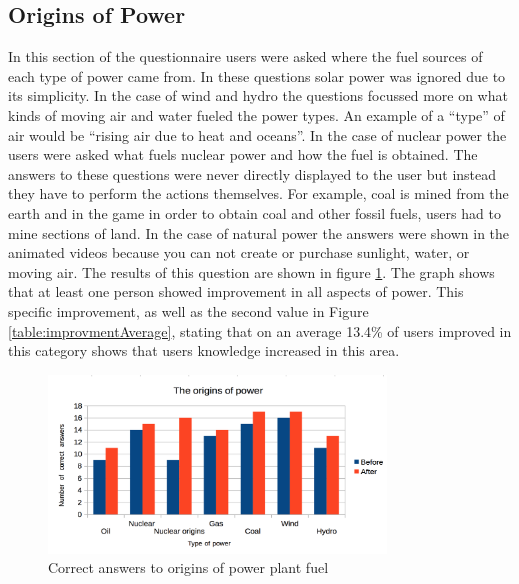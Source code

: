 \documentclass[msc,oneside]{ubcthesis}%
\begin{document}
\subsection{Origins of Power}
  In this section of the questionnaire users were asked where the fuel sources of each type of power came from. In these questions solar power was ignored due to its simplicity. In the case of wind and hydro the questions focussed more on what kinds of moving air and water fueled the power types. An example of a ``type'' of air would be ``rising air due to heat and oceans''. In the case of nuclear power the users were asked what fuels nuclear power and how the fuel is obtained. The answers to these questions were never directly displayed to the user but instead they have to perform the actions themselves. For example, coal is mined from the earth and in the game in order to obtain coal and other fossil fuels, users had to mine sections of land. In the case of natural power the answers were shown in the animated videos because you can not create or purchase sunlight, water, or moving air. The results of this question are shown in figure \ref{origins}. The graph shows that at least one person showed improvement in all aspects of power. This specific improvement, as well as the second value in Figure \ref{table:improvmentAverage}, stating that on an average 13.4\% of users improved in this category shows that users knowledge increased in this area.

  \begin{figure}[hbt]
  \begin{center}
    \includegraphics[width=0.8\textwidth]{survey_pics/post_and_pre/origins}
    \caption[Origins of power fuel]{Correct answers to origins of power plant fuel}\label{origins}
  \end{center}
\end{figure}
\end{document}
